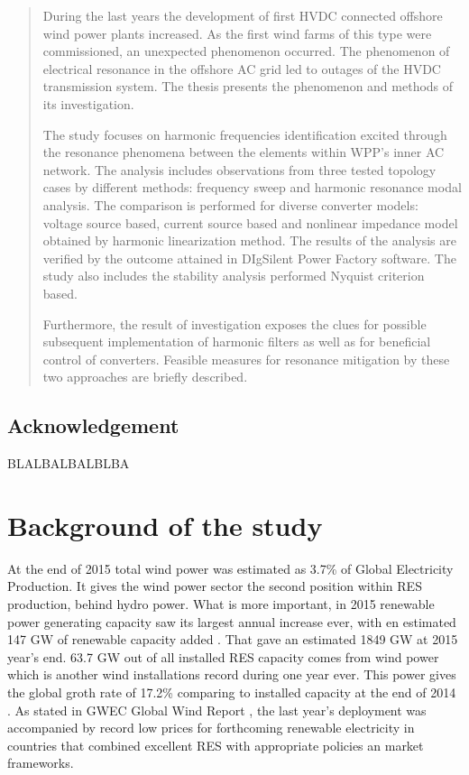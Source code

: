 \documentclass[12pt]{report} %
\begin{document}



\begin{abstract}
During the last years the development of first HVDC connected offshore wind power plants increased. As the first wind farms of this type were commissioned, an unexpected phenomenon occurred. The phenomenon of electrical resonance in the offshore AC grid led to outages of the HVDC transmission system. The thesis presents the phenomenon and methods of its investigation.

The study focuses on harmonic frequencies identification excited through the resonance phenomena between the elements within WPP's inner AC network. The analysis includes observations from three tested topology cases by different methods: frequency sweep and harmonic resonance modal analysis. The comparison is performed for diverse converter models: voltage source based, current source based and nonlinear impedance model obtained by harmonic linearization method. The results of the analysis are verified by the outcome attained in DIgSilent Power Factory software. The study also includes the stability analysis performed Nyquist criterion based.

Furthermore, the result of investigation exposes the clues for possible subsequent implementation of harmonic filters as well as for beneficial control of converters. Feasible measures for resonance mitigation by these two approaches are briefly described.
\end{abstract}

\section*{Acknowledgement}
BLALBALBALBLBA
\newpage

\tableofcontents
\newpage
{}

\chapter{Background of the study} \label{sec:motivation}
At the end of 2015 total wind power was estimated as 3.7\% of Global Electricity Production. It gives the wind power sector the second position within RES production, behind hydro power. What is more important, in 2015 renewable power generating capacity saw its largest annual increase ever, with en estimated 147 GW of renewable capacity added \cite{renewables2016}. That gave an estimated 1849 GW at 2015 year's end. 63.7 GW out of all installed RES capacity comes from wind power which is another wind installations record during one year ever. This power gives the global groth rate of 17.2\% comparing to installed capacity at the end of 2014 \cite{wwea2016}. As stated in GWEC Global Wind Report \cite{gwec2015}, the last year's deployment was accompanied by record low prices for forthcoming renewable electricity in countries that combined excellent RES with appropriate policies an market frameworks.
\end{document}
